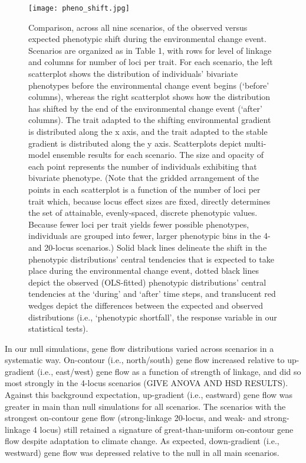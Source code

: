 \documentclass[9pt,twocolumn,twoside,lineno]{pnas-new}
\begin{document}
\begin{figure}
\centering
\texttt{[image: pheno\_shift.jpg]}
\caption{Comparison, across all nine scenarios, of the observed versus expected phenotypic shift during the environmental change event. Scenarios are organized as in Table 1, with rows for level of linkage and columns for number of loci per trait. For each scenario, the left scatterplot shows the distribution of individuals’ bivariate phenotypes before the environmental change event begins (‘before’ columns), whereas the right scatterplot shows how the distribution has shifted by the end of the environmental change event (‘after’ columns). The trait adapted to the shifting environmental gradient is distributed along the x axis, and the trait adapted to the stable gradient is distributed along the y axis. Scatterplots depict multi-model ensemble results for each scenario. The size and opacity of each point represents the number of individuals exhibiting that bivariate phenotype. (Note that the gridded arrangement of the points in each scatterplot is a function of the number of loci per trait which, because locus effect sizes are fixed, directly determines the set of attainable, evenly-spaced, discrete phenotypic values. Because fewer loci per trait yields fewer possible phenotypes, individuals are grouped into fewer, larger phenotypic bins in the 4- and 20-locus scenarios.) Solid black lines delineate the shift in the phenotypic distributions’ central tendencies that is expected to take place during the environmental change event, dotted black lines depict the observed (OLS-fitted) phenotypic distributions’ central tendencies at the ‘during’ and ‘after’ time steps, and translucent red wedges depict the differences between the expected and observed distributions (i.e., ‘phenotypic shortfall’, the response variable in our statistical tests).
}
\label{fig:pheno_shift}
\end{figure}

In our null simulations, gene flow distributions varied across scenarios in a systematic way. On-contour (i.e., north/south) gene flow increased relative to up-gradient (i.e., east/west) gene flow as a function of strength of linkage, and did so most strongly in the 4-locus scenarios (GIVE ANOVA AND HSD RESULTS). Against this background expectation, up-gradient (i.e., eastward) gene flow was greater in main than null simulations for all scenarios.  The scenarios with the strongest on-contour gene flow (strong-linkage 20-locus, and weak- and strong-linkage 4 locus) still retained a signature of great-than-uniform on-contour gene flow despite adaptation to climate change. As expected, down-gradient (i.e., westward) gene flow was depressed relative to the null in all main scenarios.
\end{document}

